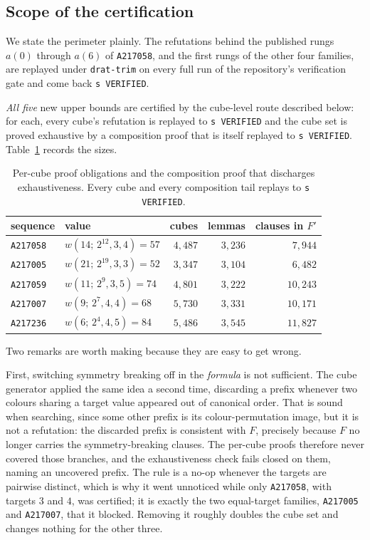 \documentclass[12pt]{article}
\theoremstyle{remark}
\newcommand{\seq}[1]{\texttt{#1}}
\begin{document}
\subsection{Scope of the certification}

We state the perimeter plainly. The refutations behind the published rungs
$a(0)$ through $a(6)$ of \seq{A217058}, and the first rungs of the other
four families, are replayed under \texttt{drat-trim} on every full run of
the repository's verification gate and come back \texttt{s VERIFIED}.

\emph{All five} new upper bounds are certified by the cube-level route
described below: for each, every cube's refutation is replayed to
\texttt{s VERIFIED} and the cube set is proved exhaustive by a composition
proof that is itself replayed to \texttt{s VERIFIED}. Table~\ref{tab:certified}
records the sizes.

\begin{table}[h]
\centering
\begin{tabular}{llrrr}
\toprule
sequence & value & cubes & lemmas & clauses in $F'$ \\
\midrule
\seq{A217058} & $w(14;\,2^{12},3,4)=57$ & $4{,}487$ & $3{,}236$ & $7{,}944$ \\
\seq{A217005} & $w(21;\,2^{19},3,3)=52$ & $3{,}347$ & $3{,}104$ & $6{,}482$ \\
\seq{A217059} & $w(11;\,2^{9},3,5)=74$  & $4{,}801$ & $3{,}222$ & $10{,}243$ \\
\seq{A217007} & $w(9;\,2^{7},4,4)=68$   & $5{,}730$ & $3{,}331$ & $10{,}171$ \\
\seq{A217236} & $w(6;\,2^{4},4,5)=84$   & $5{,}486$ & $3{,}545$ & $11{,}827$ \\
\bottomrule
\end{tabular}
\caption{Per-cube proof obligations and the composition proof that discharges
exhaustiveness. Every cube and every composition tail replays to
\texttt{s VERIFIED}.}
\label{tab:certified}
\end{table}

Two remarks are worth making because they are easy to get wrong.

First, switching symmetry breaking off in the \emph{formula} is not
sufficient. The cube generator applied the same idea a second time, discarding
a prefix whenever two colours sharing a target value appeared out of canonical
order. That is sound when searching, since some other prefix is its
colour-permutation image, but it is not a refutation: the discarded prefix is
consistent with $F$, precisely because $F$ no longer carries the
symmetry-breaking clauses. The per-cube proofs therefore never covered those
branches, and the exhaustiveness check fails closed on them, naming an
uncovered prefix. The rule is a no-op whenever the targets are pairwise
distinct, which is why it went unnoticed while only \seq{A217058}, with
targets $3$ and $4$, was certified; it is exactly the two equal-target
families, \seq{A217005} and \seq{A217007}, that it blocked. Removing it
roughly doubles the cube set and changes nothing for the other three.
\end{document}
